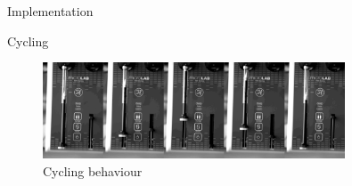 \documentclass[a0paper,landscape,fontscale=0.32]{baposter}
\begin{document}
\begin{poster}
\begin{posterbox}[name=implementation,column=1,span=2]{Implementation}
\end{posterbox}
\begin{posterbox}[name=cycling,column=1,span=2,below=implementation]{Cycling}
\begin{figure}[H]
    \begin{center}
    \includegraphics[width=0.8\textwidth]{images/combined}
    \end{center}
    \vspace{-1.2em}
  \caption{Cycling behaviour}
\end{figure}
\begin{multicols}{2}
    \lipsum[2]
\end{multicols}
\end{posterbox}


\end{poster}
\end{document}
